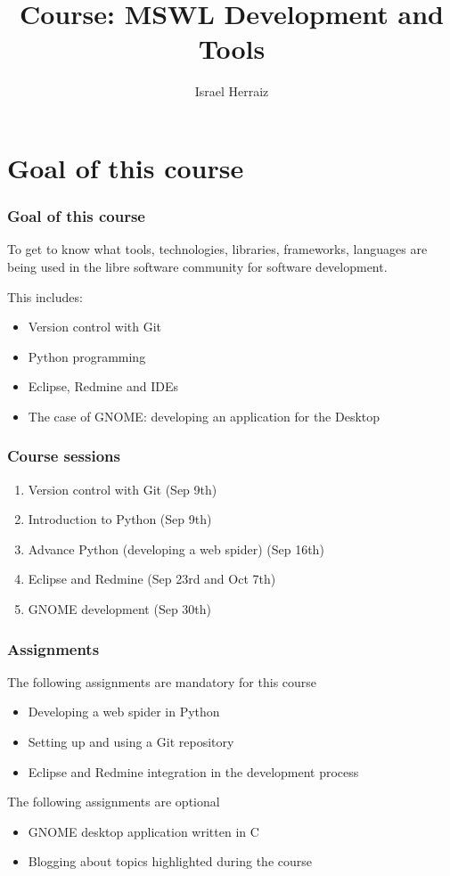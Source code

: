 \documentclass[11pt]{beamer}
\institute{israel.herraiz@upm.es \\ Universidad Politécnica de Madrid}
\title{Course: MSWL Development and Tools}
\author{Israel Herraiz}
\begin{document}
\maketitle


\section{Goal of this course}
\label{sec-1}

   
\begin{frame}[fragile]\frametitle{Goal of this course}
\label{sec-1_1}

To get to know what tools, technologies, libraries, frameworks,
languages are being used in the libre software community for software
development.

This includes:

\begin{itemize}

\item Version control with Git
\item Python programming
\item Eclipse, Redmine and IDEs
\item The case of GNOME: developing an application for the Desktop

\end{itemize}
\end{frame}

\begin{frame}[fragile]\frametitle{Course sessions}
\label{sec-1_2}

\begin{enumerate}
\item Version control with Git (Sep 9th)
\item Introduction to Python (Sep 9th)
\item Advance Python (developing a web spider) (Sep 16th)
\item Eclipse and Redmine (Sep 23rd and Oct 7th)
\item GNOME development (Sep 30th)
\end{enumerate}


\end{frame}
\begin{frame}[fragile]\frametitle{Assignments}
\label{sec-1_3}

The following assignments are mandatory for this course
\begin{itemize}
\item Developing a web spider in Python
\item Setting up and using a Git repository
\item Eclipse and Redmine integration in the development process
\end{itemize}


The following assignments are optional
\begin{itemize}
\item GNOME desktop application written in C
\item Blogging about topics highlighted during the course
\end{itemize}
\end{frame}
\end{document}
